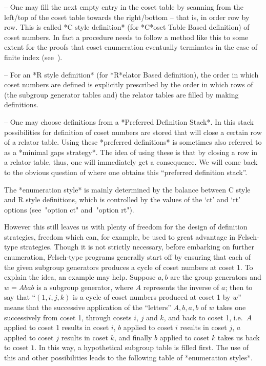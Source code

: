\beginlist

\item{--} One may fill the next empty entry  in  the  coset  table  by
scanning from the left/top of the coset table towards the right/bottom
-- that is, in order row by row. This is called *C  style  definition*
(for *C*oset Table Based definition)  of  coset  numbers.  In  fact  a
procedure needs to follow a method like this to some  extent  for  the
proofs that coset enumeration eventually terminates  in  the  case  of
finite index (see~\cite{Neu82}).

\item{--}  For  an  *R  style   definition*   (for   *R*elator   Based
definition),  the  order  in  which  coset  numbers  are  defined   is
explicitly prescribed by the order in  which  rows  of  (the  subgroup
generator  tables  and)  the  relator  tables  are  filled  by  making
definitions.

\item{--} One may choose  definitions  from  a  *Preferred  Definition
Stack*. In this stack possibilities for definition  of  coset  numbers
are stored that will close a certain row of  a  relator  table.  Using
these *preferred definitions* is  sometimes  also  referred  to  as  a
*minimal gaps strategy*. The idea of using these is that by closing  a
row in a relator table, thus, one will immediately get a  consequence.
We will come back to the obvious question of where  one  obtains  this
``preferred definition stack''.

\endlist

The *enumeration style* is mainly determined by  the  balance  between
C style and R style definitions, which is controlled by the values  of
the `ct' and `rt' options (see~"option ct" and~"option rt").

However this still leaves us with plenty of freedom for the design  of
definition strategies, freedom which can,  for  example,  be  used  to
great advantage in Felsch-type strategies. Though it is  not  strictly
necessary,  before  embarking  on  further  enumeration,   Felsch-type
programs generally start off  by  ensuring  that  each  of  the  given
subgroup generators produces a cycle of coset numbers at coset  1.  To
explain the idea, an example may help. Suppose  $a,b$  are  the  group
generators and $w=Abab$ is a subgroup generator, where $A$  represents
the inverse of $a$; then to say that ``$(1,i,j,k)$ is  a  cycle  of
coset numbers produced at coset 1 by $w$'' means  that  the  successive
application  of  the  ``letters''  $A,b,a,b$  of   $w$   takes   one
successively from coset 1, through cosets $i$, $j$ and $k$,  and  back
to coset 1, i.e.~$A$ applied to coset 1  results  in  coset  $i$,  $b$
applied to coset $i$ results in coset $j$, $a$ applied  to  coset  $j$
results in coset $k$, and finally $b$ applied to coset  $k$  takes  us
back to coset $1$. In this  way,  a  hypothetical  subgroup  table  is
filled first. The use of this and other  possibilities  leads  to  the
following table of *enumeration styles*.


